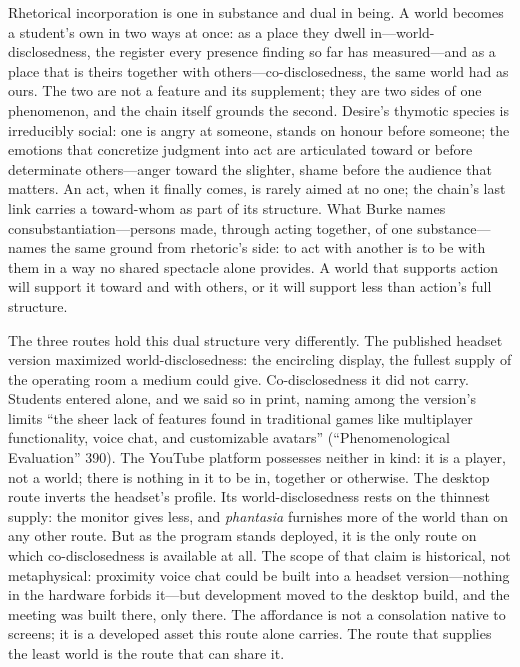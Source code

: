 Rhetorical incorporation is one in substance and dual in being. A
world becomes a student's own in two ways at once: as a place they
dwell in---world-disclosedness, the register every presence finding so
far has measured---and as a place that is theirs together with
others---co-disclosedness, the same world had as ours. The two are not
a feature and its supplement; they are two sides of one
phenomenon, and the chain itself grounds the second. Desire's thymotic
species is irreducibly social: one is angry at someone, stands on
honour before someone; the emotions that concretize judgment into act
are articulated toward or before determinate others---anger toward the
slighter, shame before the audience that matters. An act, when it
finally comes, is rarely aimed at no one; the chain's last link
carries a toward-whom as part of its structure. What Burke names
consubstantiation---persons made, through acting together, of one
substance---names the same ground from rhetoric's side: to act with
another is to be with them in a way no shared spectacle alone
provides. A world that supports action will support it toward and with
others, or it will support less than action's full structure.

The three routes hold this dual structure very differently. The
published headset version maximized world-disclosedness: the encircling
display, the fullest supply of the operating room a medium could give.
Co-disclosedness it did not carry. Students entered alone, and we said so in
print, naming among the version's limits ``the sheer lack of features
found in traditional games like multiplayer functionality, voice chat,
and customizable avatars'' (``Phenomenological Evaluation'' 390). The
YouTube platform possesses neither in kind: it is a player, not a
world; there is nothing in it to be in, together or otherwise. The
desktop route inverts the headset's profile. Its world-disclosedness
rests on the thinnest supply: the monitor gives less, and \textit{phantasia} furnishes
more of the world than on any other route. But as the program stands
deployed, it is the only route on which co-disclosedness is available
at all. The scope of that claim is historical, not metaphysical:
proximity voice chat could be built into a headset version---nothing in the
hardware forbids it---but development moved to the desktop build, and
the meeting was built there, only there. The affordance is not a
consolation native to screens; it is a developed asset this route
alone carries. The route that supplies the least world is the route
that can share it.

